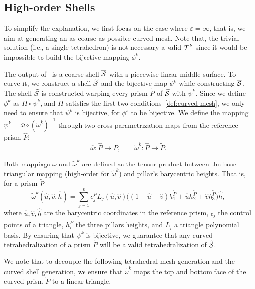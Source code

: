 \subsection{High-order Shells}\label{sec:high-order}
To simplify the explanation, we first focus on the case where $\varepsilon = \infty$, that is, we aim at generating {an} as-coarse-as-possible curved mesh. Note that, the trivial solution (i.e., a single tetrahedron) is not necessary a valid $\mathcal{T}^k$ since it would be impossible to build the bijective mapping $\phi^k$.

The output of~\cite{jiang2020bijective} is a coarse shell $\overline{\mathcal{S}}$ with {a} piecewise linear middle surface. To curve it, we construct a shell $\widetilde{\mathcal{S}}$ and the bijective map $\psi^k$ while constructing $\overline{\mathcal{S}}$. 
The shell $\widetilde{\mathcal{S}}$ is constructed warping every prism $\widetilde P$ of $\widetilde{\mathcal{S}}$ with $\psi^k$. Since we define $\phi^k$ as  $\Pi \circ \psi^k$, and $\Pi$ satisfies the first two conditions~\ref{def:curved-mesh}, we only need to ensure that $\psi^k$ is bijective, for $\phi^k$ to be bijective.  We define the mapping $\psi^k = \overline\omega\circ(\widetilde\omega^k)^{-1}$ {through} two {cross-parametrization} maps from the reference prism $\hat P$: 
\[
\overline\omega \colon \hat P \to \overline P, \qquad
\widetilde\omega^k \colon \hat P \to \widetilde P.
\]

Both mappings $\overline\omega$ and $\widetilde\omega^k$ are defined as the tensor product between the base triangular mapping (high-order for $\widetilde\omega^k$) and pillar's {barycentric} heights. That is, for a prism $\widetilde P$
\[
\widetilde\omega^k (\hat u,\hat v, \hat h) = 
\sum_{j=1}^n c_j^P L_j(\hat u,\hat v) \big((1-\hat u - \hat v)  h_1^{\widetilde P}+ \hat u h_2^{\widetilde P} + \hat v  h_3^{\widetilde P}\big)\hat h,
\]
where $\hat u,\hat v,\hat h$ are the barycentric coordinates in the reference prism, $c_j$ the control points of a triangle, $h_i^{\widetilde P}$ the three pillars heights, and $L_j$ a triangle polynomial basis.
By ensuring that $\psi^k$ is bijective, we guarantee that any curved tetrahedralization of a prism $\widetilde P$ will be a valid tetrahedralization of $\widetilde{\mathcal{S}}$.

We note that to decouple the following tetrahedral mesh generation and the curved shell generation, we ensure that $\widetilde\omega^k$ maps the top and bottom face of the curved prism $\widetilde P$ to a linear triangle.

